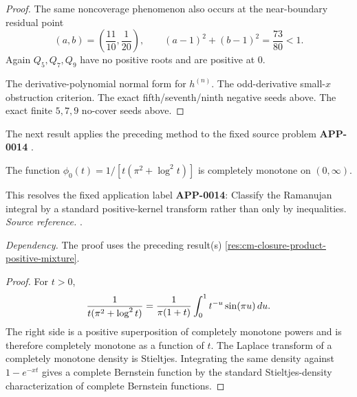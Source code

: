\begin{proof}
The same noncoverage phenomenon also occurs at the near-boundary residual point
\[
(a,b)=\left(\frac{11}{10},\frac1{20}\right),
\qquad
(a-1)^2+(b-1)^2=\frac{73}{80}<1.
\]
Again \(Q_5,Q_7,Q_9\) have no positive roots and are positive at \(0\).

The derivative-polynomial normal form for \(h^{(n)}\).
The odd-derivative small-\(x\) obstruction criterion.
The exact fifth/seventh/ninth negative seeds above.
The exact finite \(5,7,9\) no-cover seeds above.
\end{proof}

The next result applies the preceding method to the fixed source problem \textbf{APP-0014} \cite{mishra-swaminathan-ramanujan}.
\begin{corollary}
\label{res:ramanujan-density-logsquare-cm}
The function \(\phi_0(t)=1/[t(\pi^2+\log^2 t)]\) is completely monotone on \((0,\infty)\).

This resolves the fixed application label \textbf{APP-0014}: Classify the Ramanujan integral by a standard positive-kernel transform rather than only by inequalities.
\emph{Source reference.} \cite{mishra-swaminathan-ramanujan}.

\emph{Dependency.} The proof uses the preceding result(s) \ref{res:cm-closure-product-positive-mixture}.
\end{corollary}
\begin{proof}
For \(t>0\),
\[
 {1\over t(\pi^2+\log^2t)}
   ={1\over \pi(1+t)}\int_0^1 t^{-u}\sin(\pi u)\,du .
\]
The right side is a positive superposition of completely monotone powers and is
therefore completely monotone as a function of \(t\).  The Laplace transform of
a completely monotone density is Stieltjes.  Integrating the same density
against \(1-e^{-xt}\) gives a complete Bernstein function by the standard
Stieltjes-density characterization of complete Bernstein functions.
\end{proof}

